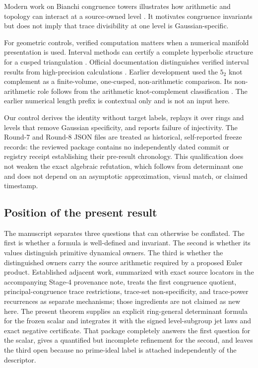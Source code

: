 \documentclass[11pt,a4paper]{article}
\theoremstyle{definition}
\theoremstyle{remark}
\begin{document}
Modern work on Bianchi congruence towers illustrates how arithmetic and topology can interact at a source-owned level \citep[Introduction and Sec.~2]{PfaffRaimbault2020}. It motivates congruence invariants but does not imply that trace divisibility at one level is Gaussian-specific.

For geometric controls, verified computation matters when a numerical manifold presentation is used.
Interval methods can certify a complete hyperbolic structure for a cusped triangulation \citep[Thm.~5.1 and Secs.~3--5]{HIKMOT2016}.
Official documentation distinguishes verified interval results from high-precision calculations \citep[verified computations and \texttt{verify\_hyperbolicity}]{SnapPyDocs2026}.
Earlier development used the \(5_2\) knot complement as a finite-volume, one-cusped, non-arithmetic comparison.
Its non-arithmetic role follows from the arithmetic knot-complement classification \citep[main theorem]{Reid1991}. The earlier numerical length prefix is contextual only and is not an input here.

Our control derives the identity without target labels, replays it over rings and levels that remove Gaussian specificity, and reports failure of injectivity. The Round-7 and Round-8 JSON files are treated as historical, self-reported freeze records: the reviewed package contains no independently dated commit or registry receipt establishing their pre-result chronology. This qualification does not weaken the exact algebraic refutation, which follows from determinant one and does not depend on an asymptotic approximation, visual match, or claimed timestamp.

\subsection{Position of the present result}

The manuscript separates three questions that can otherwise be conflated. The first is whether a formula is well-defined and invariant. The second is whether its values distinguish primitive dynamical owners. The third is whether the distinguished owners carry the source arithmetic required by a proposed Euler product. Established adjacent work, summarized with exact source locators in the accompanying Stage-4 provenance note, treats the first congruence quotient, principal-congruence trace restrictions, trace-set non-specificity, and trace-power recurrences as separate mechanisms; those ingredients are not claimed as new here. The present theorem supplies an explicit ring-general determinant formula for the frozen scalar and integrates it with the signed level-subgroup jet laws and exact negative certificate. That package completely answers the first question for the scalar, gives a quantified but incomplete refinement for the second, and leaves the third open because no prime-ideal label is attached independently of the descriptor.
\end{document}
